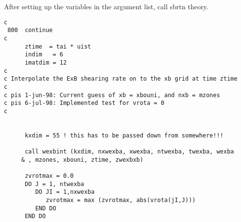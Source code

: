 After setting up the variables in the argument list, call sbrtn theory.

\begin{verbatim}
c
 800  continue
c
      ztime  = tai * uist
      indim   = 6
      imatdim = 12
c
c Interpolate the ExB shearing rate on to the xb grid at time ztime
c
c pis 1-jun-98: Current guess of xb = xbouni, and nxb = mzones
c pis 6-jul-98: Implemented test for vrota = 0
c


      kxdim = 55 ! this has to be passed down from somewhere!!!

      call wexbint (kxdim, nxwexba, xwexba, ntwexba, twexba, wexba
     & , mzones, xbouni, ztime, zwexbxb)

      zvrotmax = 0.0
      DO J = 1, ntwexba
         DO JI = 1,nxwexba
            zvrotmax = max (zvrotmax, abs(vrota(jI,J)))
         END DO
      END DO


\end{verbatim}
